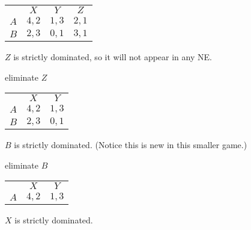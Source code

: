 \documentclass[12pt,letterpaper]{report}
\begin{document}
\begin{ex}
  \begin{minipage}{0.4\textwidth}
    \centering
    \renewcommand{\arraystretch}{1.25}
    \begin{tabular}{c |c|c|c|}
      \multicolumn{1}{c}{} & \multicolumn{1}{c}{$X$} & \multicolumn{1}{c}{$Y$}
        & \multicolumn{1}{c}{$Z$} \\
      \cline{2-4}
      $A$ & $4, 2$ & $1, 3$ & $2, 1$ \\
      \cline{2-4}
      $B$ & $2, 3$ & $0, 1$ & $3, 1$ \\
      \cline{2-4}
    \end{tabular}
  \end{minipage}\hfill\begin{minipage}{0.6\textwidth}
    $Z$ is strictly dominated, so it will not appear in any NE.
  \end{minipage}

  \hspace{0.20\textwidth} \scalebox{2}{$\downarrow$} \quad eliminate $Z$

  \begin{minipage}{0.4\textwidth}
    \centering
    \renewcommand{\arraystretch}{1.25}
    \begin{tabular}{c |c|c|}
      \multicolumn{1}{c}{} & \multicolumn{1}{c}{$X$} & \multicolumn{1}{c}{$Y$} \\
      \cline{2-3}
      $A$ & $4, 2$ & $1, 3$ \\
      \cline{2-3}
      $B$ & $2, 3$ & $0, 1$ \\
      \cline{2-3}
    \end{tabular}
  \end{minipage}\hfill\begin{minipage}{0.6\textwidth}
    $B$ is strictly dominated.
    (Notice this is new in this smaller game.)
  \end{minipage}

  \hspace{0.20\textwidth} \scalebox{2}{$\downarrow$} \quad eliminate $B$

  \begin{minipage}{0.4\textwidth}
    \centering
    \renewcommand{\arraystretch}{1.25}
    \begin{tabular}{c |c|c|}
      \multicolumn{1}{c}{} & \multicolumn{1}{c}{$X$} & \multicolumn{1}{c}{$Y$} \\
      \cline{2-3}
      $A$ & $4, 2$ & $1, 3$ \\
      \cline{2-3}
    \end{tabular}
  \end{minipage}\hfill\begin{minipage}{0.6\textwidth}
    $X$ is strictly dominated.
  \end{minipage}


\end{ex}
\end{document}
